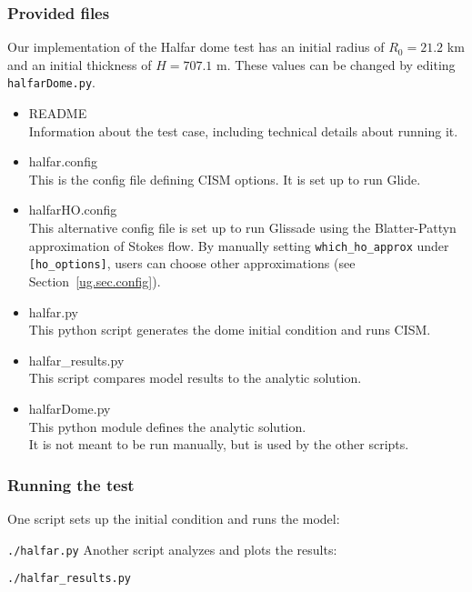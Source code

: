 \subsubsection{Provided files}
\label{subsec:halfar_files}

Our implementation of the Halfar dome test has an initial radius of $R_0=21.2$ km and an initial thickness of $H=707.1$ m.
These values can be changed by editing \texttt{halfarDome.py}.

\begin{itemize}
	\item README \\
		Information about the test case, including technical details about running it.
	\item halfar.config \\
	        This is the config file defining CISM options. It is set up to run Glide. \\
        \item halfarHO.config \\
              This alternative config file is set up to run Glissade
              using the Blatter-Pattyn approximation of Stokes flow. By manually setting
              \texttt{which\_ho\_approx} under \texttt{[ho\_options]}, users can choose other approximations 
              (see Section~\ref{ug.sec.config}).
	\item halfar.py \\
		This python script generates the dome initial condition and runs CISM.
	\item halfar\_results.py \\
		This script compares model results to the analytic solution.
	\item halfarDome.py \\
		This python module defines the analytic solution. \\
    		 It is not meant to be run manually, but is used by the other scripts.
\end{itemize}

\subsubsection{Running the test}
One script sets up the initial condition and runs the model:

\texttt{./halfar.py}
%
Another script analyzes and plots the results:

\texttt{./halfar\_results.py}


